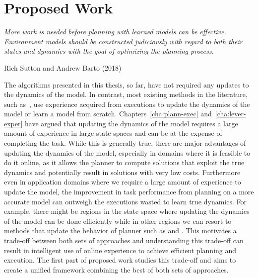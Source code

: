 \chapter{Proposed Work}
\label{cha:proposed-work}

\epigraph{\textit{More work is needed before planning with learned
    models can be effective. Environment models should be
    constructed judiciously with regard to both their states and
    dynamics with the goal of optimizing the planning process.}}{Rich
  Sutton and Andrew Barto (2018)}

The algorithms presented in this thesis, so
far, have not required any updates to the dynamics of the model. In
contrast, most existing methods in the literature, such
as~\cite{DBLP:journals/ml/KearnsS02, DBLP:journals/jmlr/BrafmanT02,
  DBLP:conf/atal/JongS07, 
  DBLP:journals/pami/DeisenrothFR15, DBLP:conf/icml/AbbeelQN06, 
  DBLP:conf/aaai/Jiang18, rastogi2018sample}, use experience
acquired from executions to update the dynamics of the model or learn
a model from scratch.
Chapters~\ref{cha:plann-exec} and~\ref{cha:lever-exper} have
argued that updating the dynamics of the model requires a large amount
of experience in large state spaces and can be at the expense of
completing the task. While this is generally true, there are major
advantages of updating the dynamics of the model, especially in
domains where it 
is feasible to do it online, as it allows the planner to compute
solutions that exploit the true dynamics and potentially result in
solutions with very low costs. Furthermore even in application domains
where we require a large amount of experience to update the model,
the improvement in task performance from planning on a more accurate
model can outweigh the executions wasted to learn true dynamics. For
example, there might be regions in the state space where updating the
dynamics of the model can be done efficiently while in other regions
we can resort to methods that update the behavior of planner such as
\cmax{} and \cmaxpp{}. This motivates a trade-off between both sets of
approaches and understanding this trade-off can result in intelligent
use of online experience to achieve efficient planning and
execution. The first part of proposed work studies this trade-off
and aims to create a unified framework combining the best of both
sets of approaches.

